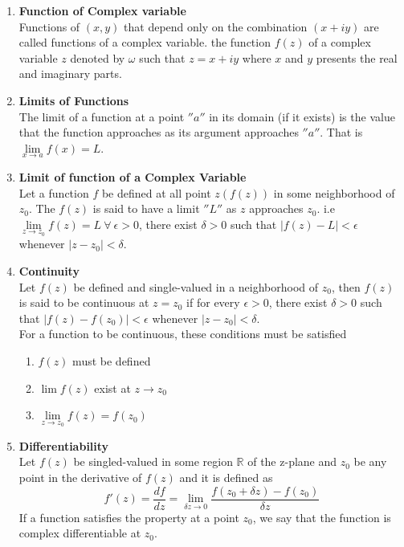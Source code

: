 \documentclass[11pt]{report}
\newcommand{\bt}[1]{\textbf{#1}}
\newcommand{\real}{ \mathbb{R}}
\begin{document}
	\begin{enumerate}
		\item\bt{Function of Complex variable}\\
		Functions of $(x,y)$ that depend only on the combination $(x+iy)$ are called functions of a complex variable. the function $f(z)$ of a complex variable $z$ denoted by $\omega$ such that $z=x+iy$ where $x$ and $y$ presents the real and imaginary parts.
		
		\item\bt{Limits of Functions}\\
		The limit of a function at a point $''a''$ in its domain (if it exists) is the value that the function approaches as its argument approaches $''a''$. That is $\lim\limits_{x\rightarrow a}f(x) = L$.
		
		\item\bt{Limit of function of a Complex Variable}\\
		Let a function $f$ be defined at all point $z(f(z))$ in some neighborhood of $z_0$. The $f(z)$ is said to have a limit $''L''$ as $z$ approaches $z_0$. i.e $\lim\limits_{z\rightarrow z_0}f(z) =L ~\forall~ \epsilon > 0$, there exist $\delta>0$ such that $|f(z)-L|<\epsilon$ whenever $|z-z_0|<\delta$.
		
		
		\item\bt{Continuity}\\
		Let $f(z)$ be defined and single-valued in a neighborhood of $z_0$, then $f(z)$ is said to be continuous at $z=z_0$ if for every $\epsilon >0$, there exist $\delta > 0$ such that $|f(z)-f(z_0)|<\epsilon$ whenever $|z-z_0|< \delta$.\\
		For a function to be continuous, these conditions must be satisfied
		\begin{enumerate}
			\item $f(z)$ must be defined
			\item $\lim f(z)$ exist at $z\rightarrow z_0$
			\item $\lim\limits_{z\rightarrow z_0}f(z) = f(z_0)$
		\end{enumerate}
		\item\bt{Differentiability}\\
		Let $f(z)$ be singled-valued in some region $\real$ of the z-plane and $z_0$ be any point in the derivative of $f(z)$ and it is defined as
		\begin{equation}
			f'(z) = \frac{df}{dz} = \lim\limits_{\delta z\rightarrow 0 }\frac{f(z_0 + \delta z) - f(z_0)}{\delta z}
		\end{equation}	
		If a function satisfies the property at a point $z_0$, we say that the function is complex differentiable at $z_0$.
		

\end{enumerate}
\end{document}
